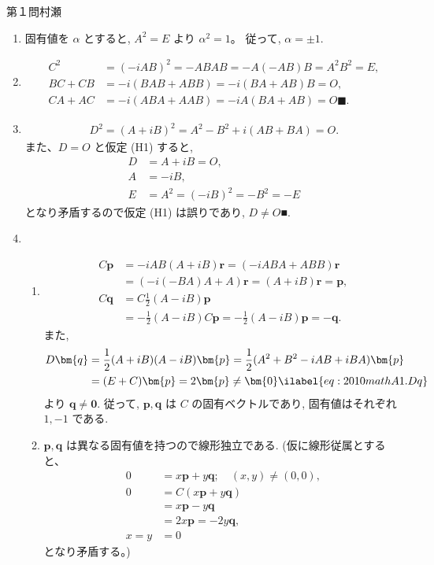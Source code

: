 \begin{answer}{第１問}{村瀬}
\begin{enumerate}
\item
  固有値を $\alpha$ とすると, 
  $A^2=E$ より $\alpha^2=1$。
  従って, $\alpha=\pm1$.
\item
  \begin{align*}
    C^2   &= (-iAB)^2 = -ABAB = -A(-AB)B = A^2 B^2 = E,\\
    BC+CB &= -i(BAB+ABB) = -i (BA+AB) B = O,\\
    CA+AC &= -i(ABA+AAB) = -i A (BA+AB) = O \text{■}.
  \end{align*}
\item
  \begin{align*}
    D^2 = (A+iB)^2 = A^2 - B^2 + i (AB + BA) = O.
  \end{align*}
  また、$D=O$ と仮定 (H1) すると,
  \begin{align*}
    D &= A+iB = O,\\
    A &= -iB,\\
    E &= A^2 = (-iB)^2 = -B^2 = -E
  \end{align*}
  となり矛盾するので仮定 (H1) は誤りであり, $D \ne O$■.

\item
  \begin{enumerate}
  \item
    \begin{align*}
      C\bm{p}
        &= -iAB (A+iB) \bm{r}= (-i ABA + ABB) \bm{r} \\
        &= (-i(-BA)A + A)\bm{r} = (A+iB)\bm{r} = \bm{p},\\
      C\bm{q}
        &= C\frac12(A-iB)\bm{p}\\
        &= -\frac12(A-iB)C\bm{p}= -\frac12(A-iB)\bm{p} = -\bm{q}.
    \end{align*}
    また,
    \begin{align}
      D\bm{q}
        &= \frac12(A+iB)(A-iB)\bm{p} = \frac12(A^2+B^2-iAB+iBA)\bm{p}\nonumber\\
        &= (E+C)\bm{p} = 2\bm{p} \ne \bm{0} \ilabel{eq:2010mathA1.Dq}
    \end{align}
    より $\bm{q} \ne \bm{0}$.
    従って, $\bm{p}, \bm{q}$ は $C$ の固有ベクトルであり,
    固有値はそれぞれ $1, -1$ である.
  \item
    $\bm{p}, \bm{q}$ は異なる固有値を持つので線形独立である.
    (仮に線形従属とすると、
    \begin{align*}
      0 &= x\bm{p} + y \bm{q};\quad (x,y)\ne(0,0),\\
      0 &= C(x\bm{p} + y \bm{q}) \\
        &= x\bm{p} - y \bm{q} \\
        &= 2 x\bm{p} = - 2 y \bm{q},\\
      x = y &= 0
    \end{align*}
    となり矛盾する。)
  \end{enumerate}


\end{enumerate}
\end{answer}
